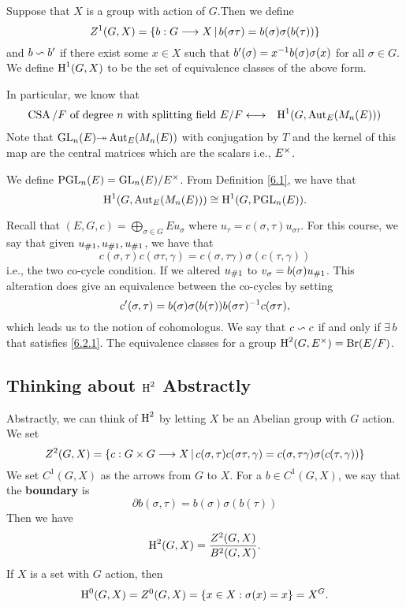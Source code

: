 \begin{defn}\label{6.1}
Suppose that $X$ is a group with action of $G$.Then we define 
$$Z^1(G,X) = \left\lbrace b: G \longrightarrow X \,|\, b(\sigma\tau) = b(\sigma) \sigma(b(\tau)) \right\rbrace$$ and 
$b\backsim b'$ if there exist some $x \in X$ such that $b'(\sigma) = x^{-1} b(\sigma)\sigma(x)$ for all $\sigma \in G$. We define $\text{H}^1(G,X)$ to be the set of equivalence classes of the above form. 

In particular, we know that 
\begin{eqnarray*}
\operatorname{CSA}/F \text{ of degree $n$ with splitting field } E/F & \longleftrightarrow & \text{H}^1(G,\operatorname{Aut}_E(M_n(E))) 
\end{eqnarray*}
Note that $\GL_n(E) \surj \Aut_E(M_n(E))$ with conjugation by $T$ and the kernel of this map are the central matrices which are the scalars i.e., $E^{\times}$.
\end{defn}
\begin{defn}\label{6.2}
We define $\operatorname{PGL}_n(E) = \operatorname{GL}_n(E)/ E^{\times}$. From Definition \ref{6.1}, we have that 
$$\text{H}^1(G,\operatorname{Aut}_E(M_n(E))) \cong \text{H}^1(G,\operatorname{PGL}_n(E)).$$
\end{defn}
Recall that $(E,G,c) = \bigoplus_{\sigma \in G} E u_{\sigma}$ where $u_{\tau} = c(\sigma,\tau)u_{\sigma\tau}.$ For this course, we say that given $\ns{\sigma},\ns{\tau},\ns{\gamma}$, we have that
$$c(\sigma , \tau)c(\sigma\tau , \gamma) = c(\sigma ,\tau \gamma)\sigma(c(\tau ,\gamma))$$
i.e., the two co-cycle condition. If we altered $\ns{\sigma}$ to $v_{\sigma} = b(\sigma)\ns{\sigma}$. This alteration does give an equivalence between the co-cycles by setting 
\begin{equation}\label{6.2.1}
c'(\sigma , \tau) = b(\sigma)\sigma (b(\tau))b(\sigma \tau)^{-1} c(\sigma \tau),
\end{equation} 
which leads us to the notion of cohomologus. We say that $c\backsim c $ if and only if $ \exists \, b $ that satisfies \eqref{6.2.1}. The equivalence classes for a group $\text{H}^2(G,E^{\times}) = \operatorname{Br} (E/F)$.
\subsection{Thinking about $\text{H}^2$ Abstractly}
Abstractly, we can think of $\text{H}^2$ by letting $X$ be an Abelian group with $G$ action. We set 
$$Z^2(G,X) = \left\lbrace c : G \times G \longrightarrow X \, | \, c(\sigma , \tau)c(\sigma\tau , \gamma) = c(\sigma ,\tau \gamma)\sigma(c(\tau ,\gamma)) \right\rbrace$$
We set $C^1(G,X)$ as the arrows from $G$ to $ X$. For a $b \in C^1(G,X)$, we say that the \textbf{boundary} is 
$$\partial b (\sigma ,\tau) = b(\sigma )\sigma(b(\tau))$$
Then we have 
$$\text{H}^2(G,X) = \frac{Z^2(G,X)}{B^2(G,X)}.$$
If $X$ is a set with $G$ action, then 
$$\text{H}^0(G,X) = Z^0(G,X) = \left\lbrace x \in X : \sigma (x) = x \right\rbrace = X^G.$$

